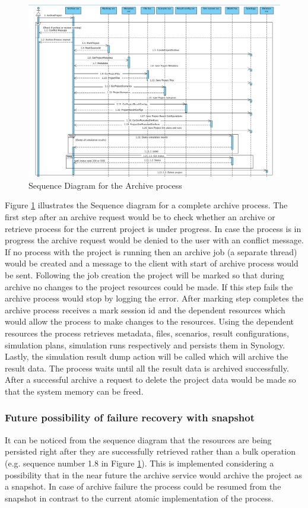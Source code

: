 \newpage
\begin{figure}[H]
    \centering \includegraphics[scale=0.5, angle=90, origin=c]{grafiken/sequenceArchive.png}
    \caption{Sequence Diagram for the Archive process}
    \label{fig:sequenceArchive}
\end{figure}

Figure \ref{fig:sequenceArchive} illustrates the Sequence diagram for a complete archive process. The first step after an archive request would be to check
whether an archive or retrieve process for the current project is under progress. In case the process is in progress the archive request would be denied to the
user with an conflict message. If no process with the project is running then an archive job (a separate thread) would be created and a message to the client with start of archive process would be
sent. Following the job creation the project will be marked so that during archive no changes to the project resources could be made. If this step fails the archive 
process would stop by logging the error. After marking step completes the archive process receives a mark session id and the dependent resources which would allow the process to make
changes to the resources. Using the dependent resources the process retrieves metadata, files, scenarios, result configurations, simulation plans, simulation runs 
respectively and persists them in Synology. Lastly, the simulation result dump action will be called which will archive the result data. The process waits until
all the result data is archived successfully. After a successful archive a request to delete the project data would be made so that the system memory can be freed.

\subsubsection{Future possibility of failure recovery with snapshot}
It can be noticed from the sequence diagram that the resources are being persisted right after they are successfully retrieved rather than a bulk operation
(e.g. sequence number 1.8 in Figure \ref{fig:sequenceArchive}). This
is implemented considering a possibility that in the near future the archive service would archive the project as a snapshot. In case of archive failure the process
could be resumed from the snapshot in contrast to the current atomic implementation of the process.

